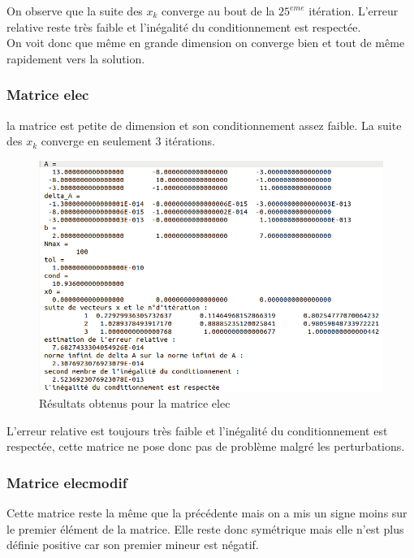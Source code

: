 \documentclass[12,french]{report}
\begin{document}
On observe que la suite des $x_{k}$ converge au bout de la $25^{eme}$ itération. L'erreur relative reste très faible et l'inégalité du conditionnement est respectée.\\
On voit donc que même en grande dimension on converge bien et tout de même rapidement vers la solution.

\subsubsection{Matrice elec}
la matrice est petite de dimension et son conditionnement assez faible. La suite des $x_{k}$ converge en seulement 3 itérations.

\begin{figure}[H]
	\centering
	\includegraphics[width=1\textwidth]{./Images/elec_1.res}
	\caption{Résultats obtenus pour la matrice elec}
\end{figure}

L'erreur relative est toujours très faible et l'inégalité du conditionnement est respectée, cette matrice ne pose donc pas de problème malgré les perturbations.

\subsubsection{Matrice elecmodif}

Cette matrice reste la même que la précédente mais on a mis un signe moins sur le premier élément de la matrice. Elle reste donc symétrique mais elle n'est plus définie positive car son premier mineur est négatif. 
\end{document}
